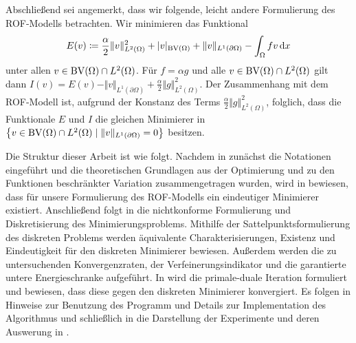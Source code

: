Abschließend sei angemerkt, dass wir folgende, leicht andere Formulierung des 
ROF-Modells betrachten. Wir minimieren das Funktional
\begin{align*}
  E(v)\coloneqq \frac{\alpha}{2}\Vert v\Vert_{L^2(\Omega)}^2 + |v|_{\textup{BV}(\Omega)}
  +\Vert v\Vert_{L^1(\partial\Omega)}-\int_\Omega fv\,\mathrm{d}x
\end{align*}
unter allen $v\in\textup{BV}(\Omega)\cap L^2(\Omega)$.
Für $f = \alpha g$ und alle $v\in \textup{BV}(\Omega)\cap
L^2(\Omega)$ gilt dann $I(v) =
E(v) - \Vert v\Vert_{L^1(\partial \Omega)}+ \frac{\alpha}{2}\Vert
g\Vert_{L^2(\Omega)}^2$. 
Der Zusammenhang mit dem ROF-Modell ist, aufgrund der Konstanz des Terms
$\frac{\alpha}{2}\Vert g\Vert_{L^2(\Omega)}^2$, folglich, dass die Funktionale
$E$ und $I$ die gleichen Minimierer in $\left\{v\in\textup{BV}(\Omega)\cap
L^2(\Omega)\mid \Vert v\Vert_{L^1(\partial\Omega)}=0\right\}$ besitzen.

Die Struktur dieser Arbeit ist wie folgt.
Nachdem in  zunächst die Notationen
eingeführt und die theoretischen Grundlagen aus der Optimierung und zu den
Funktionen beschränkter Variation zusammengetragen wurden, wird in
 bewiesen, dass für unsere 
Formulierung des ROF-Modells ein eindeutiger Minimierer existiert.
Anschließend folgt in  die nichtkonforme Formulierung
und Diskretisierung des Minimierungsproblems. Mithilfe der
Sattelpunktsformulierung des diskreten Problems werden äquivalente
Charakterisierungen, Existenz und Eindeutigkeit für den diskreten Minimierer
bewiesen. Außerdem werden die zu untersuchenden Konvergenzraten, der
Verfeinerungsindikator und die garantierte untere Energieschranke aufgeführt.
In  wird die primale-duale Iteration formuliert und
bewiesen, dass diese gegen den diskreten Minimierer konvergiert. 
Es folgen in  Hinweise zur Benutzung des Programm und
Details zur Implementation des Algorithmus und schließlich in
 die Darstellung der Experimente und deren Auswerung in
.

